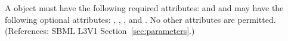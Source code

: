 A \Parameter object must have the following required attributes: 
 and 
and may have the following optional attributes:
, , ,  and 
.  No other attributes are permitted.  
(References: SBML L3V1 Section~\ref{sec:parameters}.)
